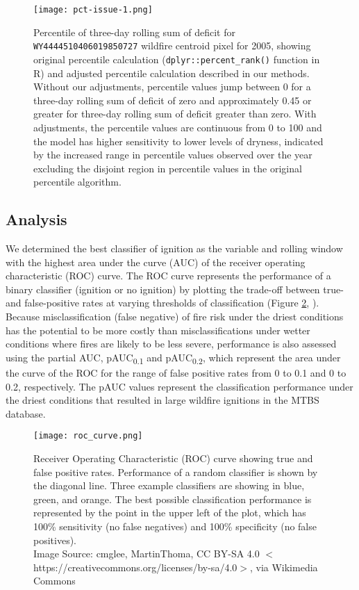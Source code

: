 \documentclass[11p]{article}
\newcommand{\pauc}[1]{pAUC\textsubscript{#1}}
\begin{document}
\begin{figure}[htbp]
  \centering
  \texttt{[image: pct-issue-1.png]}
  \caption{Percentile of three-day rolling sum of deficit for \texttt{WY4444510406019850727} wildfire centroid pixel for 2005, showing original percentile calculation (\texttt{dplyr::percent\_rank()} function in R) and adjusted percentile calculation described in our methods. Without our adjustments, percentile values jump between 0 for a three-day rolling sum of deficit of zero and approximately 0.45 or greater for three-day rolling sum of deficit greater than zero. With adjustments, the percentile values are continuous from 0 to 100 and the model has higher sensitivity to lower levels of dryness, indicated by the increased range in percentile values observed over the year excluding the disjoint region in percentile values in the original percentile algorithm.}
  \label{fig:pct-issue}
\end{figure}

\subsection{Analysis}

We determined the best classifier of ignition as the variable and rolling window with the highest area under the curve (AUC) of the receiver operating characteristic (ROC) curve. The ROC curve represents the performance of a binary classifier (ignition or no ignition) by plotting the trade-off between true- and false-positive rates at varying thresholds of classification (Figure \ref{fig:roc}, \citet{pontiusRecommendationsUsingRelative2014}). Because misclassification (false negative) of fire risk under the driest conditions has the potential to be more costly than misclassifications under wetter conditions where fires are likely to be less severe, performance is also assessed using the partial AUC, \pauc{0.1} and \pauc{0.2}, which represent the area under the curve of the ROC for the range of false positive rates from 0 to 0.1 and 0 to 0.2, respectively. The pAUC values represent the classification performance under the driest conditions that resulted in large wildfire ignitions in the MTBS database.

\begin{figure}[htbp]
  \centering
  \texttt{[image: roc\_curve.png]}
  \caption{Receiver Operating Characteristic (ROC) curve showing true and false positive rates. Performance of a random classifier is shown by the diagonal line. Three example classifiers are showing in blue, green, and orange. The best possible classification performance is represented by the point in the upper left of the plot, which has 100\% sensitivity (no false negatives) and 100\% specificity (no false positives). \\ Image Source: cmglee, MartinThoma, CC BY-SA 4.0 $<$https://creativecommons.org/licenses/by-sa/4.0$>$, via Wikimedia Commons}
    \label{fig:roc}
\end{figure}
\end{document}

